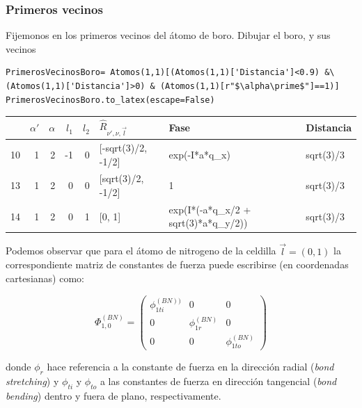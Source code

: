 \documentclass[12pt,a4paper]{article}
\begin{document}
\subsubsection{Primeros vecinos}
\label{sec:org03c31d2}
Fijemonos en los primeros vecinos del átomo de boro. 
\color{red} Dibujar el boro, y sus vecinos \normalcolor

\begin{verbatim}
PrimerosVecinosBoro= Atomos(1,1)[(Atomos(1,1)['Distancia']<0.9) &\
(Atomos(1,1)['Distancia']>0) & (Atomos(1,1)[r"$\alpha\prime$"]==1)]
PrimerosVecinosBoro.to_latex(escape=False)
\end{verbatim}

\begin{tabular}{lrrrrlll}
\toprule
{} &  $\alpha\prime$ &  $\alpha$ &  $l_1$ &  $l_2$ & $\hat R_{\nu\prime,\nu,\vec l}$ &                                 Fase &  Distancia \\
\midrule
10 &               1 &         2 &     -1 &      0 &              [-sqrt(3)/2, -1/2] &                        exp(-I*a*q_x) &  sqrt(3)/3 \\
13 &               1 &         2 &      0 &      0 &               [sqrt(3)/2, -1/2] &                                    1 &  sqrt(3)/3 \\
14 &               1 &         2 &      0 &      1 &                          [0, 1] &  exp(I*(-a*q_x/2 + sqrt(3)*a*q_y/2)) &  sqrt(3)/3 \\
\bottomrule
\end{tabular}



Podemos observar que para el  átomo de nitrogeno de la celdilla \(\vec l = (0,1)\) la correspondiente matriz de constantes de fuerza puede escribirse (en coordenadas cartesianas) como:

\begin{equation}
\label{eq:1}
\Phi^{(BN)}_{1,0}=\begin{pmatrix}
\phi_{1ti}^{(BN))} & 0 & 0 \\
0 & \phi_{1r}^{(BN)} & 0 \\
 0 & 0  & \phi_{1to}^{(BN)}
\end{pmatrix}
\end{equation} 

donde \(\phi_r\) hace referencia a la constante de fuerza en la dirección radial (\emph{bond stretching}) y \(\phi_{ti}\) y \(\phi_{to}\) a las constantes de fuerza en dirección tangencial (\emph{bond bending}) dentro y fuera de plano, respectivamente.
\end{document}
